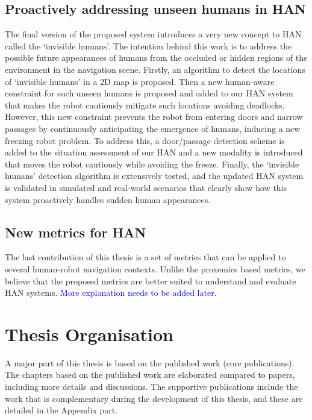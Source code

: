 \subsection*{Proactively addressing unseen humans in HAN}
The final version of the proposed system introduces a very new concept to HAN called the `invisible humans'. The intention behind this work is to address the possible future appearances of humans from the occluded or hidden regions of the environment in the navigation scene. Firstly, an algorithm to detect the locations of `invisible humans' in a 2D map is proposed. Then a new human-aware constraint for such unseen humans is proposed and added to our HAN system that makes the robot cautiously mitigate such locations avoiding deadlocks. However, this new constraint prevents the robot from entering doors and narrow passages by continuously anticipating the emergence of humans, inducing a new freezing robot problem. To address this, a door/passage detection scheme is added to the situation assessment of our HAN and a new modality is introduced that moves the robot cautiously while avoiding the freeze. Finally, the `invisible humans' detection algorithm is extensively tested, and the updated HAN system is validated in simulated and real-world scenarios that clearly show how this system proactively handles sudden human appearances.


\subsection*{New metrics for HAN}
The last contribution of this thesis is a set of metrics that can be applied to several human-robot navigation contexts. Unlike the proxemics based metrics, we believe that the proposed metrics are better suited to understand and evaluate HAN systems. \textcolor{blue}{More explanation needs to be added later}. 


\section*{Thesis Organisation}
A major part of this thesis is based on the published work (core publications). The chapters based on the published work are elaborated compared to papers, including more details and discussions. The supportive publications include the work that is complementary during the development of this thesis, and these are detailed in the Appendix part.


